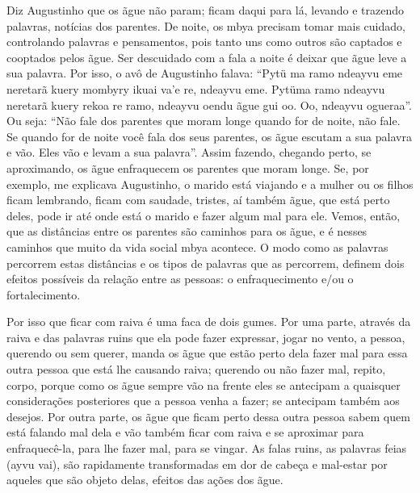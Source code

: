 Diz Augustinho que os ãgue não param; ficam daqui para lá, levando e
trazendo palavras, notícias dos parentes. De noite, os mbya precisam
tomar mais cuidado, controlando palavras e pensamentos, pois tanto uns
como outros são captados e cooptados pelos ãgue. Ser descuidado com a
fala a noite é deixar que ãgue leve a sua palavra. Por isso, o avô de
Augustinho falava: ``Pytü ma ramo ndeayvu eme neretarã kuery mombyry
ikuai va’e re, ndeayvu eme. Pytüma ramo ndeayvu neretarã kuery rekoa re
ramo, ndeayvu oendu ãgue gui oo. Oo, ndeayvu ogueraa''. Ou seja: ``Não
fale dos parentes que moram longe quando for de noite, não fale. Se
quando for de noite você fala dos seus parentes, os ãgue escutam a sua
palavra e vão. Eles vão e levam a sua palavra''. Assim fazendo, chegando
perto, se aproximando, os ãgue enfraquecem os parentes que moram longe.
Se, por exemplo, me explicava Augustinho, o marido está viajando e a
mulher ou os filhos ficam lembrando, ficam com saudade, tristes, aí
também ãgue, que está perto deles, pode ir até onde está o marido e fazer
algum mal para ele. Vemos, então, que as distâncias entre os parentes
são caminhos para os ãgue, e é nesses caminhos que muito da vida social
mbya acontece. O modo como as palavras percorrem estas distâncias e
os tipos de palavras que as percorrem, definem dois efeitos possíveis
da relação entre as pessoas: o enfraquecimento e/ou o fortalecimento.

Por isso que ficar com raiva é uma faca de dois gumes. Por uma parte,
através da raiva e das palavras ruins que ela pode fazer expressar,
jogar no vento, a pessoa, querendo ou sem querer, manda os ãgue que
estão perto dela fazer mal para essa outra pessoa que está lhe causando
raiva; querendo ou não fazer mal, repito, corpo, porque como os ãgue
sempre vão na frente eles se antecipam a quaisquer considerações
posteriores que a pessoa venha a fazer; se antecipam também aos
desejos. Por outra parte, os ãgue que ficam perto dessa outra pessoa
sabem quem está falando mal dela e vão também ficar com raiva e se
aproximar para enfraquecê-la, para lhe fazer mal, para se vingar. As
falas ruins, as palavras feias (ayvu vai), são rapidamente
transformadas em dor de cabeça e mal-estar por aqueles que são objeto
delas, efeitos das ações dos ãgue.

